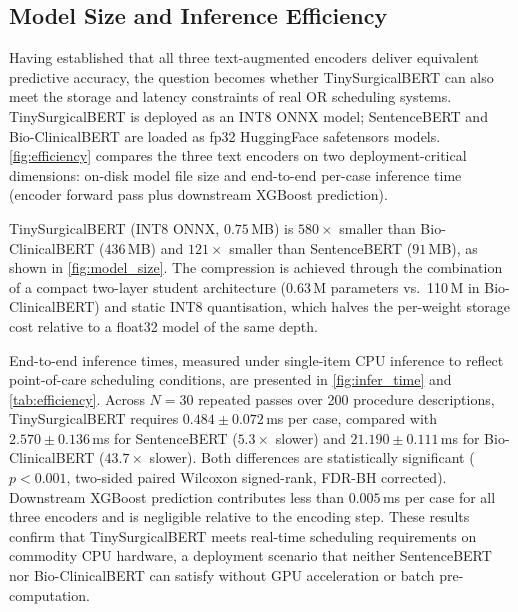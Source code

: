 \subsection{Model Size and Inference Efficiency}
\label{sec:runtime}

Having established that all three text-augmented encoders deliver equivalent predictive accuracy, the question becomes whether TinySurgicalBERT can also meet the storage and latency constraints of real OR scheduling systems. TinySurgicalBERT is deployed as an INT8 ONNX model; SentenceBERT and Bio-ClinicalBERT are loaded as fp32 HuggingFace safetensors models. \cref{fig:efficiency} compares the three text encoders on two deployment-critical dimensions: on-disk model file size and end-to-end per-case inference time (encoder forward pass plus downstream XGBoost prediction).

TinySurgicalBERT (INT8 ONNX, $0.75$\,MB) is $580\times$ smaller than Bio-ClinicalBERT ($436$\,MB) and $121\times$ smaller than SentenceBERT ($91$\,MB), as shown in \cref{fig:model_size}. The compression is achieved through the combination of a compact two-layer student architecture (0.63\,M parameters vs.\ 110\,M in Bio-ClinicalBERT) and static INT8 quantisation, which halves the per-weight storage cost relative to a float32 model of the same depth.

End-to-end inference times, measured under single-item CPU inference to reflect point-of-care scheduling conditions, are presented in \cref{fig:infer_time} and \cref{tab:efficiency}. Across $N = 30$ repeated passes over 200 procedure descriptions, TinySurgicalBERT requires $0.484 \pm 0.072$\,ms per case, compared with $2.570 \pm 0.136$\,ms for SentenceBERT ($5.3\times$ slower) and $21.190 \pm 0.111$\,ms for Bio-ClinicalBERT ($43.7\times$ slower). Both differences are statistically significant ($p < 0.001$, two-sided paired Wilcoxon signed-rank, FDR-BH corrected). Downstream XGBoost prediction contributes less than $0.005$\,ms per case for all three encoders and is negligible relative to the encoding step. These results confirm that TinySurgicalBERT meets real-time scheduling requirements on commodity CPU hardware, a deployment scenario that neither SentenceBERT nor Bio-ClinicalBERT can satisfy without GPU acceleration or batch pre-computation.

